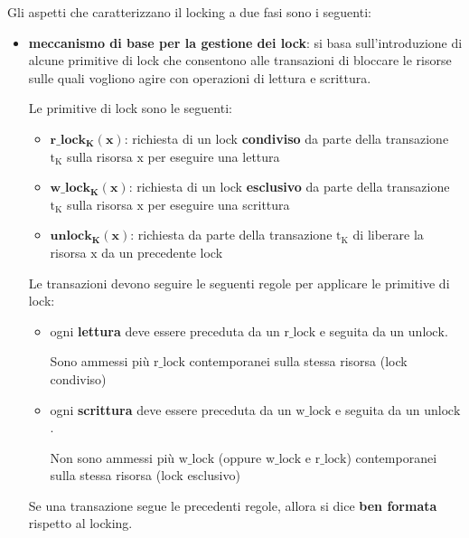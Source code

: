 \smallskip
Gli aspetti che caratterizzano il locking a due fasi sono i seguenti:
\begin{itemize}[label=$\triangleright$, itemsep=\medskipamount]
  \item \textbf{meccanismo di base per la gestione dei lock}: si basa sull'introduzione di alcune primitive di lock che consentono alle transazioni di bloccare le risorse sulle quali vogliono agire con operazioni di lettura e scrittura. 
  
  Le primitive di lock sono le seguenti:
  \begin{itemize}[label=$\diamond$, itemsep=\smallskipamount]
    \item \( \mathbf{r\_lock_K(x)} \): richiesta di un lock \textbf{condiviso} da parte della
      transazione \( \mathrm{t_K} \) sulla risorsa \( \mathrm{x} \) per eseguire una lettura

    \item \( \mathbf{w\_lock_K(x)} \): richiesta di un lock \textbf{esclusivo} da parte della
      transazione \( \mathrm{t_K} \) sulla risorsa \( \mathrm{x} \) per eseguire una scrittura

    \item \(\mathbf{ unlock_K(x)} \): richiesta da parte della transazione \( \mathrm{t_K} \) di liberare la risorsa \( \mathrm{x} \) da un precedente lock
  \end{itemize}
  
  \smallskip
  Le transazioni devono seguire le seguenti regole per applicare le primitive di
  lock:
  \begin{itemize}[label=$\circ$, itemsep=\smallskipamount]
    \item ogni \textbf{lettura} deve essere preceduta da un \( \mathrm{r\_lock} \) e seguita
      da un \( \mathrm{unlock} \). 
      
      Sono ammessi più \( \mathrm{r\_lock} \) contemporanei sulla stessa risorsa (lock condiviso)

    \item ogni \textbf{scrittura} deve essere preceduta da un \( \mathrm{w\_lock} \) e seguita da un \( \mathrm{unlock} \). 
    
    Non sono ammessi più \( \mathrm{w\_lock} \) (oppure \( \mathrm{w\_lock} \) e \( \mathrm{r\_lock} \)) contemporanei sulla stessa risorsa (lock esclusivo)
  \end{itemize}
  
  Se una transazione segue le precedenti regole, allora si dice \textbf{ben formata} rispetto al locking.


\end{itemize}
